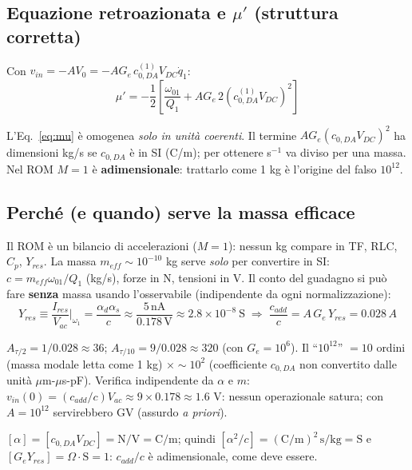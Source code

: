 \documentclass[11pt,a4paper]{article}
\begin{document}
\subsection{Equazione retroazionata e $\mu'$ (struttura corretta)}
Con $v_{in}=-AV_0=-AG_e\,c_{0,DA}^{(1)}V_{DC}\dot q_1$:
\begin{equation}
    \mu'=-\frac12\left[\frac{\omega_{01}}{Q_1}+A G_e\,2\left(c_{0,DA}^{(1)}V_{DC}\right)^2\right]
    \label{eq:mu}
\end{equation}
\begin{warnbox}
L'Eq.~\eqref{eq:mu} \`e omogenea \emph{solo in unit\`a coerenti}. Il termine $AG_e(c_{0,DA}V_{DC})^2$ ha dimensioni kg/s se $c_{0,DA}$ \`e in SI (C/m); per ottenere s$^{-1}$ va diviso per una massa. Nel ROM $M=1$ \`e \textbf{adimensionale}: trattarlo come 1 kg \`e l'origine del falso $10^{12}$.
\end{warnbox}

\subsection{Perch\'e (e quando) serve la massa efficace}\label{sec:massa}
Il ROM \`e un bilancio di accelerazioni ($M=1$): nessun kg compare in TF, RLC, $C_p$, $Y_{res}$. La massa $m_{eff}\sim10^{-10}$ kg serve \emph{solo} per convertire in SI:
$c=m_{eff}\omega_{01}/Q_1$ (kg/s), forze in N, tensioni in V. Il conto del guadagno si pu\`o fare \textbf{senza} massa usando l'osservabile (indipendente da ogni normalizzazione):
\begin{equation}
    Y_{res}\equiv\frac{I_{res}}{V_{ac}}\Big|_{\omega_1}=\frac{\alpha_d\alpha_s}{c}
    \approx\frac{5\,\mathrm{nA}}{0.178\,\mathrm{V}}\approx2.8\times10^{-8}\ \mathrm{S}
    \;\Rightarrow\;
    \frac{c_{add}}{c}=A\,G_e\,Y_{res}=0.028\,A
\end{equation}
\begin{corrbox}
$A_{\tau/2}=1/0.028\approx36$; $A_{\tau/10}=9/0.028\approx320$ (con $G_e=10^6$). Il ``$10^{12}$'' $=10$ ordini (massa modale letta come 1 kg) $\times\sim10^2$ (coefficiente $c_{0,DA}$ non convertito dalle unit\`a $\mu$m-$\mu$s-pF). Verifica indipendente da $\alpha$ e $m$: $v_{in}(0)=(c_{add}/c)V_{ac}\approx9\times0.178\approx1.6$ V: nessun operazionale satura; con $A=10^{12}$ servirebbero GV (assurdo \emph{a priori}).
\end{corrbox}
\begin{unitbox}
$[\alpha]=[c_{0,DA}V_{DC}]=\mathrm{N/V}=\mathrm{C/m}$; quindi $[\alpha^2/c]=\mathrm{(C/m)^2\,s/kg}=\mathrm{S}$ e $[G_e Y_{res}]=\Omega\cdot\mathrm{S}=1$: $c_{add}/c$ \`e adimensionale, come deve essere.
\end{unitbox}
\end{document}
